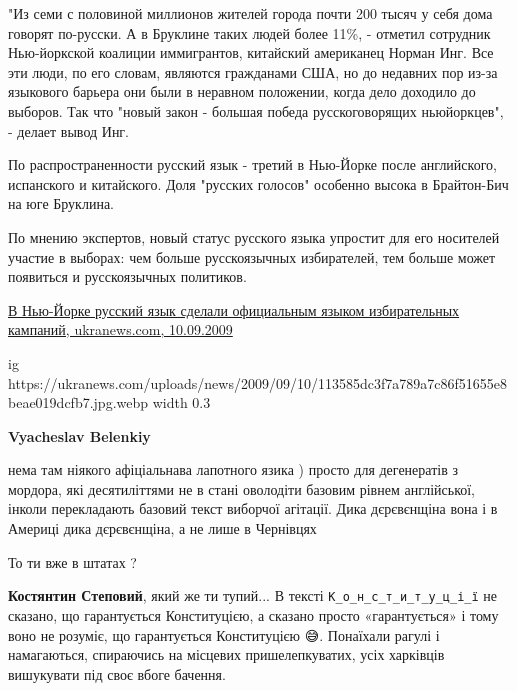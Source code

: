 \begin{itemize}
\begin{itemize}
{"Из семи с половиной миллионов жителей города почти 200 тысяч у себя дома
говорят по-русски. А в Бруклине таких людей более 11\%, - отметил сотрудник
Нью-йоркской коалиции иммигрантов, китайский американец Норман Инг. Все эти
люди, по его словам, являются гражданами США, но до недавних пор из-за
языкового барьера они были в неравном положении, когда дело доходило до
выборов. Так что "новый закон - большая победа русскоговорящих ньюйоркцев", -
делает вывод Инг.

По распространенности русский язык - третий в Нью-Йорке после английского,
испанского и китайского. Доля "русских голосов" особенно высока в Брайтон-Бич
на юге Бруклина.

По мнению экспертов, новый статус русского языка упростит для его носителей
участие в выборах: чем больше русскоязычных избирателей, тем больше может
появиться и русскоязычных политиков.
}

\href{https://ukranews.com/news/7140-v-nyu-jjorke-russkyy-yazyk-sdelaly-ofycyalnym-yazykom-yzbyratelnykh-kampanyy}{%
В Нью-Йорке русский язык сделали официальным языком избирательных кампаний, ukranews.com, 10.09.2009%
}

\ifcmt
  ig https://ukranews.com/uploads/news/2009/09/10/113585dc3f7a789a7c86f51655e8beae019dcfb7.jpg.webp
  width 0.3
\fi

 
\textbf{Vyacheslav Belenkiy} 

нема там ніякого афіціальнава лапотного язика ) просто для дегенератів з
мордора, які десятиліттями не в стані оволодіти базовим рівнем англійської,
інколи перекладають базовий текст виборчої агітації. Дика дєрєвєнщіна вона і в
Америці дика дєрєвєнщіна, а не лише в Чернівцях

То ти вже в штатах ?

 
\textbf{Костянтин Степовий}, який же ти тупий... В тексті
\verb|К_о_н_с_т_и_т_у_ц_і_ї| не сказано, що гарантується Конституцією, а
сказано просто «гарантується» і тому воно не розуміє, що гарантується
Конституцією 😅. Понаїхали рагулі і намагаються, спираючись на місцевих
пришелепкуватих, усіх харківців вишукувати під своє вбоге бачення.


\end{itemize}
\end{itemize}
